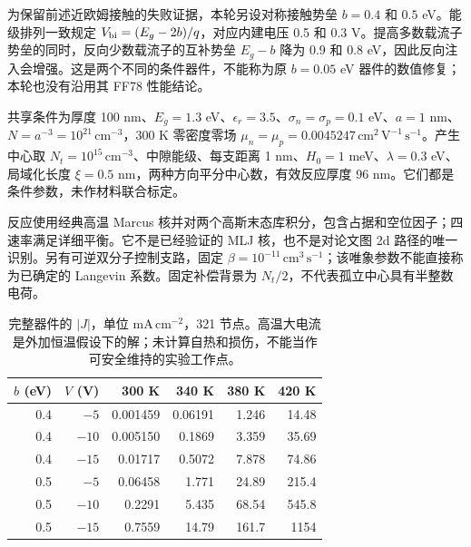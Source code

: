 {\cjkfont 为保留前述近欧姆接触的失败证据，本轮另设对称接触势垒}\allowbreak{} $b=0.4$ {\cjkfont 和}\allowbreak{} $0.5$ eV{\cjkfont 。能级排列一致规定}\allowbreak{} $V_{\rm bi}=(E_g-2b)/q${\cjkfont ，对应内建电压}\allowbreak{} 0.5 {\cjkfont 和}\allowbreak{} 0.3 V{\cjkfont 。提高多数载流子势垒的同时，反向少数载流子的互补势垒}\allowbreak{} $E_g-b$ {\cjkfont 降为}\allowbreak{} 0.9 {\cjkfont 和}\allowbreak{} 0.8 eV{\cjkfont ，因此反向注入会增强。这是两个不同的条件器件，不能称为原}\allowbreak{} $b=0.05$ eV {\cjkfont 器件的数值修复；本轮也没有沿用其}\allowbreak{} FF78 {\cjkfont 性能结论。}\allowbreak{}

{\cjkfont 共享条件为厚度}\allowbreak{} 100 nm{\cjkfont 、}\allowbreak{}$E_g=1.3$ eV{\cjkfont 、}\allowbreak{}$\epsilon_r=3.5${\cjkfont 、}\allowbreak{}$\sigma_n=\sigma_p=0.1$ eV{\cjkfont 、}\allowbreak{}$a=1$ nm{\cjkfont 、}\allowbreak{}$N=a^{-3}=10^{21}\,\mathrm{cm^{-3}}${\cjkfont ，}\allowbreak{}300 K {\cjkfont 零密度零场}\allowbreak{} $\mu_n=\mu_p=0.0045247\,\mathrm{cm^2\,V^{-1}\,s^{-1}}${\cjkfont 。产生中心取}\allowbreak{} $N_t=10^{15}\,\mathrm{cm^{-3}}${\cjkfont 、中隙能级、每支距离}\allowbreak{} 1 nm{\cjkfont 、}\allowbreak{}$H_0=1$ meV{\cjkfont 、}\allowbreak{}$\lambda=0.3$ eV{\cjkfont 、局域化长度}\allowbreak{} $\xi=0.5$ nm{\cjkfont ，两种方向平分中心数，有效反应厚度}\allowbreak{} 96 nm{\cjkfont 。它们都是条件参数，未作材料联合标定。}\allowbreak{}

{\cjkfont 反应使用经典高温}\allowbreak{} Marcus {\cjkfont 核并对两个高斯末态库积分，包含占据和空位因子；四速率满足详细平衡。它不是已经验证的}\allowbreak{} MLJ {\cjkfont 核，也不是对论文图}\allowbreak{} 2d {\cjkfont 路径的唯一识别。另有可逆双分子控制支路，固定}\allowbreak{} $\beta=10^{-11}\,\mathrm{cm^3\,s^{-1}}${\cjkfont ；该唯象参数不能直接称为已确定的}\allowbreak{} Langevin {\cjkfont 系数。固定补偿背景为}\allowbreak{} $N_t/2${\cjkfont ，不代表孤立中心具有半整数电荷。}\allowbreak{}

\begin{table}[htbp]\centering\small
\begin{tabular}{rrrrrr}\toprule
$b$ (eV)&$V$ (V)&300 K&340 K&380 K&420 K\\\midrule
0.4&$-5$&0.001459&0.06191&1.246&14.48\\
0.4&$-10$&0.005150&0.1869&3.359&35.69\\
0.4&$-15$&0.01717&0.5072&7.878&74.86\\
0.5&$-5$&0.06458&1.771&24.89&215.4\\
0.5&$-10$&0.2291&5.435&68.54&545.8\\
0.5&$-15$&0.7559&14.79&161.7&1154\\\bottomrule
\end{tabular}
\caption{{\cjkfont 完整器件的}\allowbreak{} $|J|${\cjkfont ，单位}\allowbreak{} $\mathrm{mA\,cm^{-2}}${\cjkfont ，}\allowbreak{}321 {\cjkfont 节点。高温大电流是外加恒温假设下的解；未计算自热和损伤，不能当作可安全维持的实验工作点。}\allowbreak{}}
\end{table}


